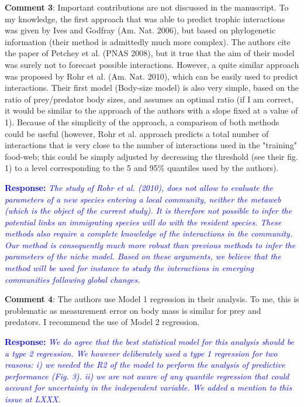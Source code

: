 \documentclass [12pt,onecolumn,twoside,openright]{report}
\begin{document}
\begin{onehalfspacing}
\medskip \textbf{Comment 3}: Important contributions are not
discussed in the manuscript. To my knowledge, the first approach that was able
to predict trophic interactions was given by Ives and Godfray (Am. Nat. 2006),
but based on phylogenetic information (their method is admittedly much more
complex). The authors cite the paper of Petchey et al. (PNAS 2008), but it true
that the aim of their model was surely not to forecast possible interactions.
However, a quite similar approach was proposed by Rohr et al. (Am. Nat. 2010),
which can be easily used to predict interactions. Their first model (Body-size
model) is also very simple, based on the ratio of prey/predator body sizes, and
assumes an optimal ratio (if I am correct, it would be similar to the approach
of the authors with a slope fixed at a value of 1). Because of the simplicity of
the approach, a comparison of both methods could be useful (however, Rohr et al.
approach predicts a total number of interactions that is very close to the
number of interactions used in the "training" food-web; this could be simply
adjusted by decreasing the threshold (see their fig. 1) to a level corresponding
to the 5 and 95\% quantiles used by the authors).

\medskip \textcolor{blue}{\textbf{Response:}} \textit{\textcolor{blue}{The study of Rohr et al. (2010), does not allow to evaluate the parameters of a new species entering a local community, neither the metaweb (which is the object of the current study). It is therefore not possible to infer the potential links an immigrating species will do with the resident species. These methods also require a complete knowledge of the interactions in the community. Our method is consequently much more robust than previous methods to infer the parameters of the niche model. Based on these arguments, we believe that the method  will be used for instance to study the interactions in emerging communities following global changes.}}

\medskip \textbf{Comment 4}: The authors use Model 1
regression in their analysis. To me, this is problematic as measurement error on
body mass is similar for prey and predators. I recommend the use of Model 2
regression.

\medskip \textcolor{blue}{\textbf{Response:}} \textit{\textcolor{blue}{We do agree that the best statistical model for this analysis should be a type 2 regression. We however deliberately used a type 1 regression for two reasons: i) we needed the R2 of the model to perform the analysis of predictive performance (Fig. 3). ii) we are not aware of any quantile regression that could account for uncertainty in the independent variable. We added a mention to this issue at LXXX.}}


\end{onehalfspacing}
\end{document}
